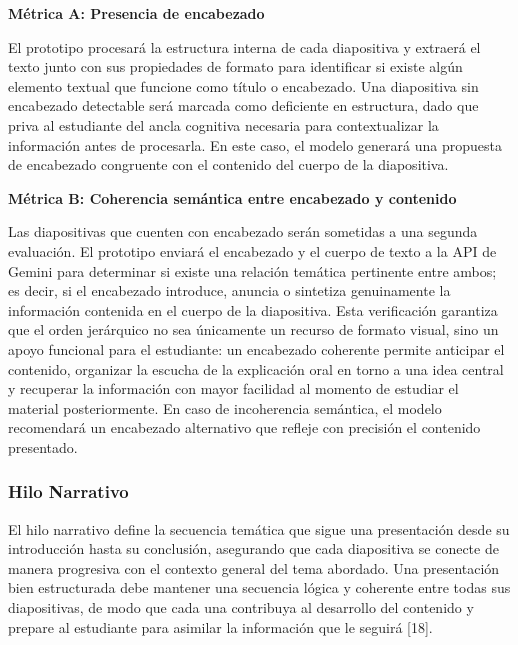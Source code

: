 \documentclass[11pt]{article}
\begin{document}
\textbf{Métrica A: Presencia de encabezado}

El prototipo procesará la estructura interna de cada diapositiva y extraerá el texto junto con sus propiedades de formato para identificar si existe algún elemento textual que funcione como título o encabezado. Una diapositiva sin encabezado detectable será marcada como deficiente en estructura, dado que priva al estudiante del ancla cognitiva necesaria para contextualizar la información antes de procesarla. En este caso, el modelo generará una propuesta de encabezado congruente con el contenido del cuerpo de la diapositiva.

\textbf{Métrica B: Coherencia semántica entre encabezado y contenido}

Las diapositivas que cuenten con encabezado serán sometidas a una segunda evaluación. El prototipo enviará el encabezado y el cuerpo de texto a la API de Gemini para determinar si existe una relación temática pertinente entre ambos; es decir, si el encabezado introduce, anuncia o sintetiza genuinamente la información contenida en el cuerpo de la diapositiva. Esta verificación garantiza que el orden jerárquico no sea únicamente un recurso de formato visual, sino un apoyo funcional para el estudiante: un encabezado coherente permite anticipar el contenido, organizar la escucha de la explicación oral en torno a una idea central y recuperar la información con mayor facilidad al momento de estudiar el material posteriormente. En caso de incoherencia semántica, el modelo recomendará un encabezado alternativo que refleje con precisión el contenido presentado.

\subsubsection*{Hilo Narrativo}

El hilo narrativo define la secuencia temática que sigue una presentación desde su introducción hasta su conclusión, asegurando que cada diapositiva se conecte de manera progresiva con el contexto general del tema abordado. Una presentación bien estructurada debe mantener una secuencia lógica y coherente entre todas sus diapositivas, de modo que cada una contribuya al desarrollo del contenido y prepare al estudiante para asimilar la información que le seguirá [18].
\end{document}
